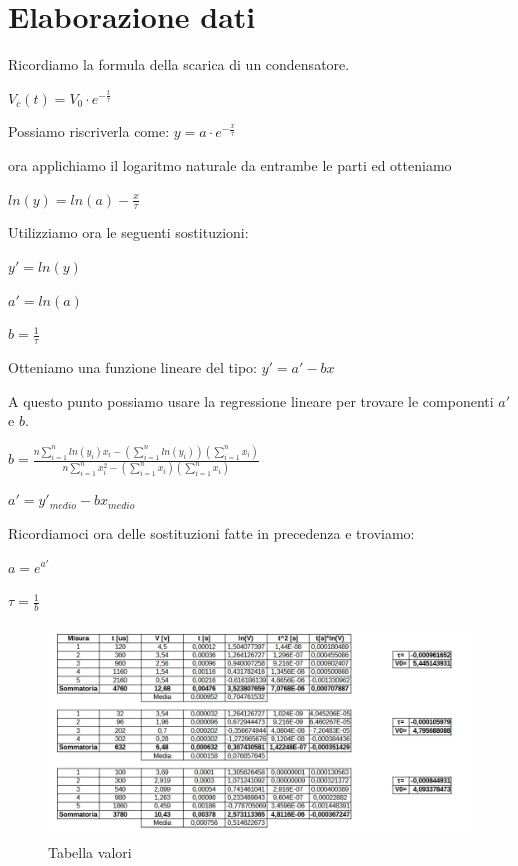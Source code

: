     \section{Elaborazione dati}
    Ricordiamo la formula della scarica di un condensatore. \par
    $V_c(t)=V_0 \cdot e^{-\frac{t}{\tau}}$ \par
    Possiamo riscriverla come: $y=a \cdot e^{-\frac{x}{\tau}}$ \par
    ora applichiamo il logaritmo naturale da entrambe le parti ed otteniamo \par
    $ln(y)=ln(a)-{\frac{x}{\tau}}$ \par
    Utilizziamo ora le seguenti sostituzioni: \par
    $y'=ln(y)$ \par
    $a'=ln(a)$ \par
    $b=\frac{1}{\tau}$ \par
    Otteniamo una funzione lineare del tipo: $y'=a'-bx$ \par
    A questo punto possiamo usare la regressione lineare per trovare le componenti $a'$ e $b$. \par
    $b=\frac{n\sum_{i = 1}^{n} ln(y_i)x_i - (\sum_{i = 1}^{n} ln(y_i))(\sum_{i = 1}^{n} x_i) }{n\sum_{i = 1}^{n} x_i^2 - (\sum_{i = 1}^{n} x_i)(\sum_{i = 1}^{n} x_i)}$ \par
    $a'=y'_{medio}-bx_{medio}$ \par
    Ricordiamoci ora delle sostituzioni fatte in precedenza e troviamo: \par
    $a=e^{a'}$ \par
    $\tau=\frac{1}{b}$ \par
    \begin{figure}[!h]
        \begin{center}
            \includegraphics[width = 16cm]{fisica.png}
            \caption{Tabella valori}
            \label{tabella valori}
        \end{center}
    \end{figure}
    
